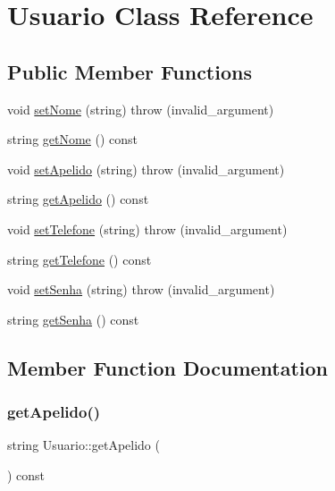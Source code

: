 \hypertarget{classUsuario}{}\section{Usuario Class Reference}
\label{classUsuario}
\subsection*{Public Member Functions}
\begin{DoxyCompactItemize}
\item 
void \hyperlink{classUsuario_a0d002d4ceff9c827457269a24a3e6c24}{set\+Nome} (string)  throw (invalid\+\_\+argument)
\item 
string \hyperlink{classUsuario_a6aeb8cccd96e84aedeb50a68b4f9a3d4}{get\+Nome} () const
\item 
void \hyperlink{classUsuario_a1da1c9170ba41c06b9adea159d21c092}{set\+Apelido} (string)  throw (invalid\+\_\+argument)
\item 
string \hyperlink{classUsuario_a78d374a50eed8b7ceeec4b874ba154d4}{get\+Apelido} () const
\item 
void \hyperlink{classUsuario_adae349ec93a5a83bb4e2b379a181431b}{set\+Telefone} (string)  throw (invalid\+\_\+argument)
\item 
string \hyperlink{classUsuario_ae2a44b0716930c62458e6fc8c7339537}{get\+Telefone} () const
\item 
void \hyperlink{classUsuario_a428675e3b6d3743e05b1297cca1dee42}{set\+Senha} (string)  throw (invalid\+\_\+argument)
\item 
string \hyperlink{classUsuario_a5a6149716b03d4b1408aaa6a0dc4bb32}{get\+Senha} () const
\end{DoxyCompactItemize}


\subsection{Member Function Documentation}
\mbox{\label{classUsuario_a78d374a50eed8b7ceeec4b874ba154d4}} 
\subsubsection{\texorpdfstring{get\+Apelido()}{getApelido()}}
{\footnotesize\ttfamily string Usuario\+::get\+Apelido (\begin{DoxyParamCaption}{ }\end{DoxyParamCaption}) const\hspace{0.3cm}{\ttfamily [inline]}}

